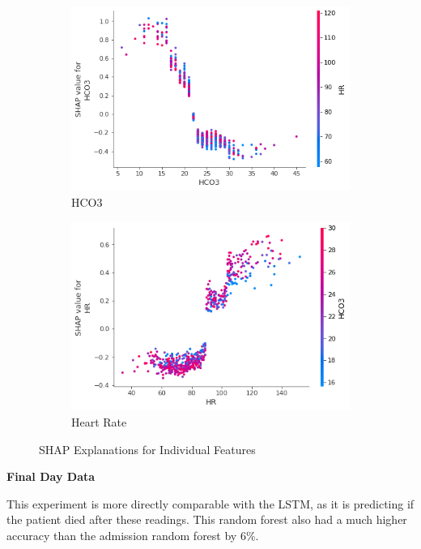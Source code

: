 \documentclass[12pt]{article}
\begin{document}
\begin{figure}[H]
\begin{subfigure}[b]{0.47\textwidth}
         \includegraphics[width=\linewidth]{TreeExplainer Admission1 Global/TreeExplainer Admission1 Global for HCO3.png}
         \caption{HCO3}
     \end{subfigure}
     \hfill
     \begin{subfigure}[b]{0.47\textwidth}
         \centering
         \includegraphics[width=\linewidth]{TreeExplainer Admission1 Global/TreeExplainer Admission1 Global for HR.png}
         \caption{Heart Rate}
     \end{subfigure}
     \caption{SHAP Explanations for Individual Features}
\end{figure}

\textbf{Final Day Data}

This experiment is more directly comparable with the LSTM, as it is predicting if the patient died after these readings. This random forest also had a much higher accuracy than the admission random forest by 6\%. 
\end{document}
